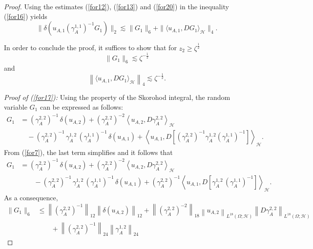 \documentclass[12pt,a4paper]{article}
\newcommand{\HH}{\mathcal{H}}
\newcommand {\deltah}{{\zeta}}
\newcommand{\<}{\langle}
\renewcommand{\>}{\rangle}
\begin{document}
\begin{proof}
  Using the estimates (\ref{for12}), (\ref{for13}) and (\ref{for20}) in the inequality (\ref{for16}) yields
\[
  \| \delta( u_{A,1}
  (\gamma_A^{1,1})^{-1}    G_1)\|_2 \lesssim    \| G_1\|_6 +   
\| \langle u_{A,1} ,D G_1 \rangle_\HH\|_4 .
\]

In order to conclude the proof, it suffices to show that for $z_2\geq \zeta^{\frac12}$
  \begin{equation} \label{for17}
  \| G_1\|_6 \lesssim \deltah^{-\frac 12}
  \end{equation}
  and
  \begin{equation} \label{for18}
    \left\| \langle u_{A,1} ,D G_1 \rangle_\HH\right\|_4 \lesssim \deltah^{-\frac 12}.
  \end{equation}
 
 \medskip
 \noindent
 {\it Proof of (\ref{for17}):} 
Using the property \cite[Proposition 1.3.3]{nualart2006} of the Skorohod integral, the random variable $G_1$ can be expressed as follows:
  \begin{align*}
  G_1&=  (\gamma_{A} ^{2,2})^{-1}\, \delta(u_{A,2})+(\gamma_{A} ^{2,2})^{-2}  \left\langle u_{A,2} , D\gamma_A^{2,2} \right\rangle_\HH \\
  &\quad
   - (\gamma_{A} ^{2,2})^{-1} \,  \gamma_{A} ^{1,2} \,
     ( \gamma_{A} ^{1,1})^{-1}\, \delta(u_{A,1} )+\left \langle u_{A,1} ,D\left[(\gamma_{A} ^{2,2})^{-1}   \gamma_{A} ^{1,2}
     ( \gamma_{A} ^{1,1})^{-1} \right] \right\rangle_\HH.
  \end{align*}
  From (\ref{for7}), the last term simplifies and it follows that
  \begin{align}
  G_1&=  (\gamma_{A} ^{2,2})^{-1}\,  \delta(u_{A,2})+(\gamma_{A} ^{2,2})^{-2}  \left\langle u_{A,2} ,D\gamma_A^{2,2} \right\rangle_\HH \nonumber\\ 
  &\qquad
   - (\gamma_{A} ^{2,2})^{-1}  \, \gamma_{A} ^{1,2}\, 
     ( \gamma_{A} ^{1,1})^{-1}\, \delta(u_{A,1} ) 
     + (\gamma_{A} ^{2,2})^{-1} \left\langle u_{A,1} ,D\left[  \gamma_{A} ^{1,2}\,
     ( \gamma_{A} ^{1,1})^{-1} \right] \right\rangle_\HH.
  \label{rd05_20e2}
  \end{align}
  As a consequence,
    \begin{align*}
  \|G_1\|_6&\leq  \left\|(\gamma_{A} ^{2,2})^{-1}\right\|_{12} \left\| \delta(u_{A,2})\right\|_{12} 
   +\left\| (\gamma_{A} ^{2,2})^{-2}\right\|_{18} \left\| u_{A,2}\right\| _{L^{18}(\Omega;\HH)}
 \left \|   D\gamma_A^{2,2}\right\| _{L^{18}(\Omega;\HH)} \\
  &\qquad
   + \left\|(\gamma_{A} ^{2,2})^{-1} \right\|_{24} \left\|  \gamma_{A} ^{1,2}\right\|_{24}

\end{align*}
\end{proof}
\end{document}
